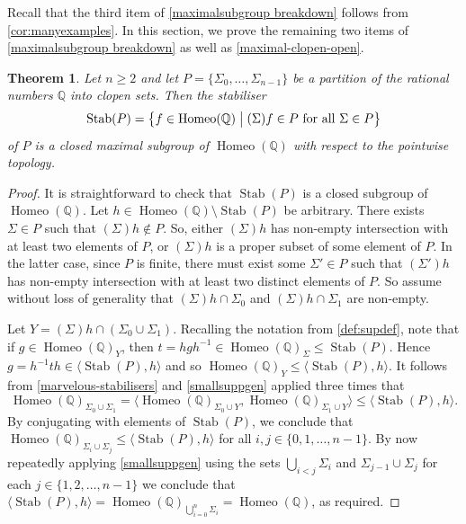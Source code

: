 \documentclass[11pt]{amsart}
\makeatletter
\newtheorem{theorem}{Theorem}[section]
\theoremstyle{definition}
\newcommand{\pstab}{\operatorname{Pstab}}
\newcommand{\Homeo}{\operatorname{Homeo}}
\newcommand{\Q}{\mathbb Q}
\newcommand{\Stab}{\operatorname{Stab}}
\newcommand{\genset}[1]{\langle #1\rangle}
\newcommand{\makeset}[2]{\left\lbrace #1 \;\middle|\;
 \begin{tabular}{@{}l@{}}
   #2
  \end{tabular}
  \right\rbrace}
\makeatother
\begin{document}
Recall that the third item of \cref{maximalsubgroup breakdown} follows from \cref{cor:manyexamples}.
In this section, we prove the remaining two items of \cref{maximalsubgroup breakdown} as well as \cref{maximal-clopen-open}.



\begin{theorem}\label{closedstab}
    Let $n\geq 2$ and let $P=\{\Sigma_0, \dots, \Sigma_{n-1}\}$ be a partition of the rational numbers $\Q$ into clopen sets. Then the stabiliser 
    $$\Stab(P)=\makeset{f\in \Homeo(\Q)}{\((\Sigma)f\in P \text{ for all }\Sigma \in P\)}$$
    of $P$ is a closed maximal subgroup of $\Homeo(\Q)$ with respect to the pointwise topology.
\end{theorem}
\begin{proof}
It is straightforward to check that $\Stab(P)$ is a closed subgroup of $\Homeo(\Q)$. 
    Let $h \in \Homeo(\Q)\setminus \Stab(P)$ be arbitrary. There exists $\Sigma \in P$ such that $(\Sigma)h \not \in P$. So, either $(\Sigma)h$ has non-empty intersection with at least two elements of $P$, or $(\Sigma)h$ is a proper subset of some element of $P$. In the latter case, since $P$ is finite, there must exist some $\Sigma' \in P$ such that $(\Sigma')h$ has non-empty intersection with at least two distinct elements of $P$. So assume without loss of generality that $(\Sigma)h\cap \Sigma_0$ and $(\Sigma)h\cap \Sigma_1$ are non-empty.

    Let $Y=(\Sigma)h\cap (\Sigma_0 \cup \Sigma_1)$. Recalling the notation from \cref{def:supdef}, note that if $g \in \Homeo(\Q)_Y$, then $t=hgh^{-1}\in \Homeo(\Q)_\Sigma\leq \Stab(P)$.
    Hence $g=h^{-1}th\in \genset{\Stab(P), h}$ and so $\Homeo(\Q)_Y\leq \genset{\Stab(P), h}$. It follows from \cref{marvelous-stabilisers} and \cref{smallsuppgen} applied three times that 
    \[\Homeo(\Q)_{\Sigma_0\cup \Sigma_1}=\langle \Homeo(\Q)_{\Sigma_0\cup Y}, \Homeo(\Q)_{\Sigma_1\cup Y}\rangle \leq \genset{\Stab(P), h}.\] 
    By conjugating with elements of $\Stab(P)$, we conclude that $\Homeo(\Q)_{\Sigma_i\cup \Sigma_j}\leq \genset{\Stab(P), h}$ for all $i,j\in \{0,1, \dots, n-1\}$. By now repeatedly applying \cref{smallsuppgen} using the sets \(\bigcup_{i<j}\Sigma_i\) and \(\Sigma_{j-1}\cup \Sigma_j\) for each \(j\in \{1,2,\ldots,n-1\}\) we conclude that $\genset{\Stab(P), h}=\Homeo(\Q)_{\bigcup_{i=0}^n \Sigma_i}=\Homeo(\Q)$, as required. 
\end{proof}
\end{document}
